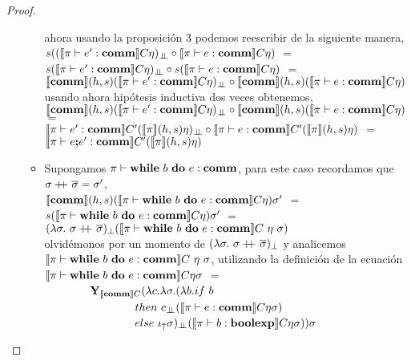 \begin{proof}
\begin{itemize}
\begin{itemize}
ahora usando la proposici\'on 3 podemos reescribir de la siguiente manera,\\

$s((\llbracket \pi \vdash e' : \textbf{comm} \rrbracket C\eta)_{\bot \!\!\! \bot} 
	\circ
	\llbracket \pi \vdash e : \textbf{comm} \rrbracket C\eta
	)$ $=$\\
$s(\llbracket \pi \vdash e' : \textbf{comm} \rrbracket C\eta)_{\bot \!\!\! \bot} 
	\circ
	s(\llbracket \pi \vdash e : \textbf{comm} \rrbracket C\eta)$ $=$\\
$\llbracket \textbf{comm} \rrbracket(h,s)(\llbracket \pi \vdash e' : \textbf{comm} \rrbracket C\eta)_{\bot \!\!\! \bot} 
	\circ
 \llbracket \textbf{comm} \rrbracket(h,s)(\llbracket \pi \vdash e : \textbf{comm} \rrbracket C\eta)$\\

usando ahora hip\'otesis inductiva dos veces obtenemos,\\

$\llbracket \textbf{comm} \rrbracket(h,s)(\llbracket \pi \vdash e' : \textbf{comm} \rrbracket C\eta)_{\bot \!\!\! \bot} 
	\circ
 \llbracket \textbf{comm} \rrbracket(h,s)(\llbracket \pi \vdash e : \textbf{comm} \rrbracket C\eta)$ $=$\\
$\llbracket \pi \vdash e' : \textbf{comm} \rrbracket C'(\llbracket \pi \rrbracket(h,s)\eta)_{\bot \!\!\! \bot}
	\circ
\llbracket \pi \vdash e : \textbf{comm} \rrbracket C'(\llbracket \pi \rrbracket(h,s)\eta)$ $=$\\
$\llbracket \pi \vdash e \textbf{;} e' : \textbf{comm} \rrbracket C'(\llbracket \pi \rrbracket(h,s)\eta)$\\

\item Supongamos $\pi \vdash \textbf{while} \ b \ \textbf{do} \ e : \textbf{comm}$, para este caso
recordamos que $\sigma +\kern-1.3ex+\kern0.8ex \overline{\sigma} = \sigma'$,\\

$\llbracket \textbf{comm} \rrbracket(h,s)(\llbracket \pi \vdash \textbf{while} \ b \ \textbf{do} \ e : \textbf{comm} \rrbracket C\eta)\sigma'$ $=$\\
$s(\llbracket \pi \vdash \textbf{while} \ b \ \textbf{do} \ e : \textbf{comm} \rrbracket C\eta)\sigma'$ $=$\\
$(\lambda \sigma. \ \sigma +\kern-1.3ex+\kern0.8ex \overline{\sigma})_{\bot}
				(\llbracket \pi \vdash \textbf{while} \ b \ \textbf{do} \ e : \textbf{comm} \rrbracket C \ \eta \ \sigma)$\\

olvid\'emonos por un momento de $(\lambda \sigma. \ \sigma +\kern-1.3ex+\kern0.8ex \overline{\sigma})_{\bot}$
y analicemos $\semBrcks{\pi \vdash \cwhiledo{b}{e} : \commt}C \ \eta \ \sigma$, utilizando
la definici\'on de la ecuaci\'on\\

$\llbracket \pi \vdash \textbf{while} \ b \ \textbf{do} \ e : \textbf{comm} \rrbracket C \eta \sigma$ $=$ \\
\indent \ \ \ \ \ \ \ \
$\textbf{Y}_{\llbracket \textbf{comm} \rrbracket C} (\lambda c . \lambda \sigma . (\lambda b . if \ b$ \\
\indent \ \ \ \ \ \ \ \ \ \ \ \ \ \ \ \
$then \ c_{\dbot}(\semBrcks{\pi \vdash e : \commt}C \eta \sigma)$ \\
\indent \ \ \ \ \ \ \ \ \ \ \ \ \ \ \ \
$else \ \iota_{\uparrow} \sigma)_{\bot \!\!\! \bot} (\llbracket \pi \vdash b : \textbf{boolexp} \rrbracket C\eta\sigma))\sigma$ \\


\end{itemize}
\end{itemize}
\end{proof}
